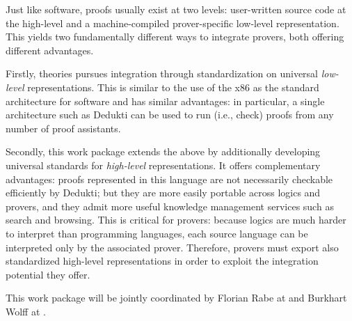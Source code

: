 \begin{workpackage}[id=structuring,wphases=0-48,type=RTD,
  short=Structured Theories and Metadata,%
  title=Structured Theories and Metadata,
  lead=Fau,
  BolRM=18,
  FauRM=48,
  SacRM=48]
  



\begin{wpobjectives}
Just like software, proofs usually exist at two levels: user-written source code at the high-level and a machine-compiled prover-specific low-level representation.
This yields two fundamentally different ways to integrate provers, both offering different advantages.

Firstly, theories pursues integration through standardization on universal \emph{low-level} representations.
This is similar to the use of the x86 as the standard architecture for software and has similar advantages: in particular, a single architecture such as Dedukti can be used to run (i.e., check) proofs from any number of proof assistants.

Secondly, this work package extends the above by additionally developing universal standards for \emph{high-level} representations.
It offers complementary advantages: proofs represented in this language are not necessarily checkable efficiently by Dedukti; but they are more easily portable across logics and provers, and they admit more useful knowledge management services such as search and browsing.
This is critical for provers: because logics are much harder to interpret than programming languages, each source language can be interpreted only by the associated prover.
Therefore, provers must export also standardized high-level representations in order to exploit the integration potential they offer.

This work package will be jointly coordinated by Florian Rabe at  and Burkhart Wolff at .
\end{wpobjectives}



\end{workpackage}
